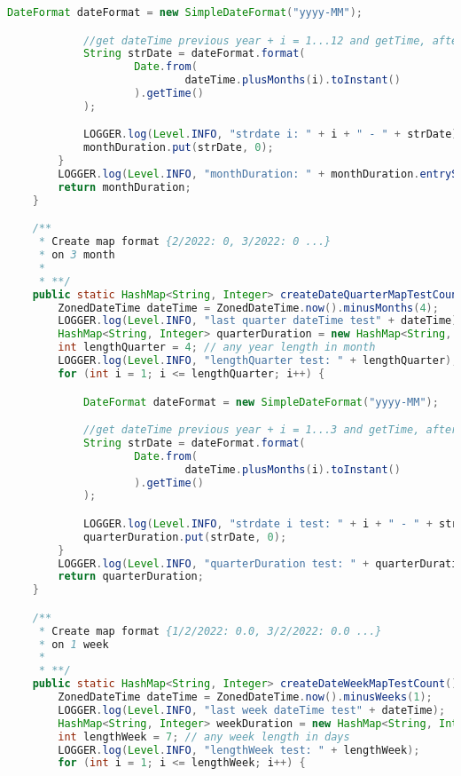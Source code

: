 \begin{lstlisting}[language=Java]
            DateFormat dateFormat = new SimpleDateFormat("yyyy-MM");

            //get dateTime previous year + i = 1...12 and getTime, after in strDate=2022-03
            String strDate = dateFormat.format(
                    Date.from(
                            dateTime.plusMonths(i).toInstant()
                    ).getTime()
            );

            LOGGER.log(Level.INFO, "strdate i: " + i + " - " + strDate);
            monthDuration.put(strDate, 0);
        }
        LOGGER.log(Level.INFO, "monthDuration: " + monthDuration.entrySet());
        return monthDuration;
    }

    /**
     * Create map format {2/2022: 0, 3/2022: 0 ...}
     * on 3 month
     *
     * **/
    public static HashMap<String, Integer> createDateQuarterMapTestCount() {
        ZonedDateTime dateTime = ZonedDateTime.now().minusMonths(4);
        LOGGER.log(Level.INFO, "last quarter dateTime test" + dateTime);
        HashMap<String, Integer> quarterDuration = new HashMap<String, Integer>();
        int lengthQuarter = 4; // any year length in month
        LOGGER.log(Level.INFO, "lengthQuarter test: " + lengthQuarter);
        for (int i = 1; i <= lengthQuarter; i++) {

            DateFormat dateFormat = new SimpleDateFormat("yyyy-MM");

            //get dateTime previous year + i = 1...3 and getTime, after in strDate=2022-03
            String strDate = dateFormat.format(
                    Date.from(
                            dateTime.plusMonths(i).toInstant()
                    ).getTime()
            );

            LOGGER.log(Level.INFO, "strdate i test: " + i + " - " + strDate);
            quarterDuration.put(strDate, 0);
        }
        LOGGER.log(Level.INFO, "quarterDuration test: " + quarterDuration.entrySet());
        return quarterDuration;
    }

    /**
     * Create map format {1/2/2022: 0.0, 3/2/2022: 0.0 ...}
     * on 1 week
     *
     * **/
    public static HashMap<String, Integer> createDateWeekMapTestCount() {
        ZonedDateTime dateTime = ZonedDateTime.now().minusWeeks(1);
        LOGGER.log(Level.INFO, "last week dateTime test" + dateTime);
        HashMap<String, Integer> weekDuration = new HashMap<String, Integer>();
        int lengthWeek = 7; // any week length in days
        LOGGER.log(Level.INFO, "lengthWeek test: " + lengthWeek);
        for (int i = 1; i <= lengthWeek; i++) {


\end{lstlisting}
